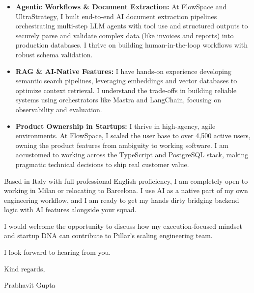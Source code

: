 \documentclass[11pt,a4paper]{article}
\begin{document}
\begin{itemize}[leftmargin=*]
    \item \textbf{Agentic Workflows \& Document Extraction:} At FlowSpace and UltraStrategy, I built end-to-end AI document extraction pipelines orchestrating multi-step LLM agents with tool use and structured outputs to securely parse and validate complex data (like invoices and reports) into production databases. I thrive on building human-in-the-loop workflows with robust schema validation.
    \item \textbf{RAG \& AI-Native Features:} I have hands-on experience developing semantic search pipelines, leveraging embeddings and vector databases to optimize context retrieval. I understand the trade-offs in building reliable systems using orchestrators like Mastra and LangChain, focusing on observability and evaluation.
    \item \textbf{Product Ownership in Startups:} I thrive in high-agency, agile environments. At FlowSpace, I scaled the user base to over 4,500 active users, owning the product features from ambiguity to working software. I am accustomed to working across the TypeScript and PostgreSQL stack, making pragmatic technical decisions to ship real customer value.
\end{itemize}

\noindent Based in Italy with full professional English proficiency, I am completely open to working in Milan or relocating to Barcelona. I use AI as a native part of my own engineering workflow, and I am ready to get my hands dirty bridging backend logic with AI features alongside your squad.

\noindent I would welcome the opportunity to discuss how my execution-focused mindset and startup DNA can contribute to Pillar's scaling engineering team.

\noindent I look forward to hearing from you.

\vspace{10pt}

\noindent Kind regards,

\vspace{10pt}

\noindent Prabhavit Gupta
\end{document}
